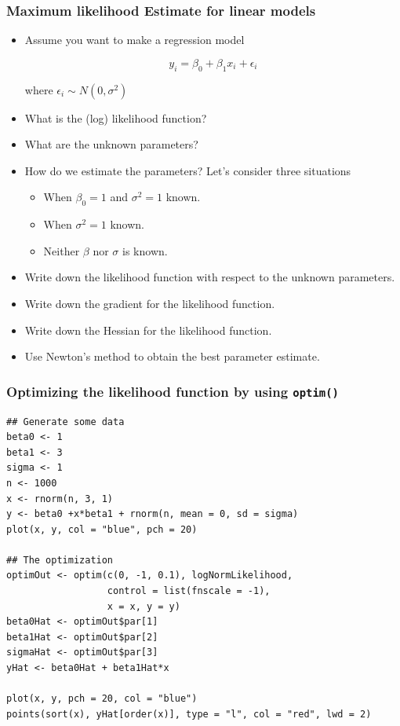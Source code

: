 \documentclass[10pt]{beamer}
\begin{document}
\begin{frame}
  \frametitle{Maximum likelihood Estimate for linear models}

  \begin{itemize}
  \item Assume you want to make a regression model

    \begin{equation*}
      y_i = \beta_0 + \beta_1 x_i + \epsilon_i
    \end{equation*}

    where $\epsilon_i \sim N(0, \sigma^2)$

  \item What is the (log) likelihood function?

  \item What are the unknown parameters?

  \item How do we estimate the parameters? Let's consider three situations


    \begin{itemize}
    \item When $\beta_0=1$ and $\sigma^2=1$ known.
    \item When $\sigma^2=1$ known.
    \item Neither $\beta$ nor $\sigma$ is known.
    \end{itemize}

    \item Write down the likelihood function with respect to the
      unknown parameters.

    \item Write down the gradient for the likelihood function.

    \item Write down the Hessian for the likelihood function.

    \item Use Newton's method to obtain the best parameter estimate.

  \end{itemize}

\end{frame}

\begin{frame}[fragile]
  \frametitle{Optimizing the likelihood function by using \texttt{optim()}}

\begin{verbatim}
## Generate some data
beta0 <- 1
beta1 <- 3
sigma <- 1
n <- 1000
x <- rnorm(n, 3, 1)
y <- beta0 +x*beta1 + rnorm(n, mean = 0, sd = sigma)
plot(x, y, col = "blue", pch = 20)

## The optimization
optimOut <- optim(c(0, -1, 0.1), logNormLikelihood,
                  control = list(fnscale = -1),
                  x = x, y = y)
beta0Hat <- optimOut$par[1]
beta1Hat <- optimOut$par[2]
sigmaHat <- optimOut$par[3]
yHat <- beta0Hat + beta1Hat*x

plot(x, y, pch = 20, col = "blue")
points(sort(x), yHat[order(x)], type = "l", col = "red", lwd = 2)
\end{verbatim}
\end{frame}
\end{document}
